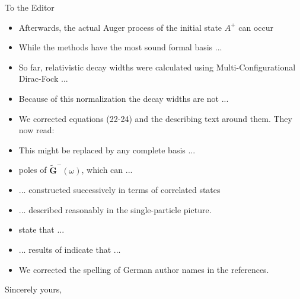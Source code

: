 \documentclass[DIN,pagenumber=false,parskip=half,fromalign=left,fromphone=true,fromemail=true,fromurl=false,fromlogo=false,fromrule=false]{scrlttr2}
\begin{document}
\begin{letter}{To the Editor}
\begin{itemize}
 \item Afterwards, the actual Auger process of the initial state $A^+$ can occur
       {\color{blue}{.}}
 \item While the {\color{blue}{CAP-based}} methods
       have the most sound formal basis ...
 \item So far, relativistic decay widths were calculated using
       {\color{blue}{Multichannel}} Multi-Configurational Dirac-Fock
       {\color{blue}{(MMCDF)}} ...
 \item Because of this {\color{blue}{different}} normalization
       the decay widths are not {\color{blue}{amenable to}} ...
 \item We corrected equations (22-24) and the describing text around them.
       They now read:\\
       {}
 \item This might be replaced by any {\color{blue}{other}} complete basis ...
 \item {\color{blue}{are}} poles of $\mathbf{\tilde{G}}^-(\omega)$, which can ... 
 \item  ... constructed successively in terms of correlated {\color{blue}{
       $N-1$ particle}} states
 \item ... described reasonably {\color{blue}{well}} in the single-particle picture.
 \item {\color{blue}{The authors}} state that ...
 \item ... results of {\color{blue}{Sukhorukov}} indicate that ...      
 \item We corrected the spelling of German author names in the references.
\end{itemize}

        \closing{Sincerely yours,}
	\end{letter}
\end{document}
